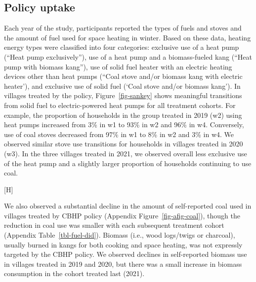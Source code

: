 \documentclass[
  letterpaper,
  DIV=11,
  numbers=noendperiod]{scrartcl}
\makeatletter
\renewenvironment{figure}%
   {\renewcommand\familydefault\sfdefault
    \@float{figure}}
   {\end@float}
\makeatother
\begin{document}
\subsection{Policy uptake}\label{policy-uptake}

Each year of the study, participants reported the types of fuels and
stoves and the amount of fuel used for space heating in winter. Based on
these data, heating energy types were classified into four categories:
exclusive use of a heat pump (``Heat pump exclusively''), use of a heat
pump and a biomass-fueled kang (``Heat pump with biomass kang''), use of
solid fuel heater with an electric heating devices other than heat pumps
(``Coal stove and/or biomass kang with electric heater'), and exclusive
use of solid fuel (`Coal stove and/or biomass kang'). In villages
treated by the policy, Figure~\ref{fig-sankey} shows meaningful
transitions from solid fuel to electric-powered heat pumps for all
treatment cohorts. For example, the proportion of households in the
group treated in 2019 (w2) using heat pumps increased from 3\% in w1 to
93\% in w2 and 96\% in w4. Conversely, use of coal stoves decreased from
97\% in w1 to 8\% in w2 and 3\% in w4. We observed similar stove use
transitions for households in villages treated in 2020 (w3). In the
three villages treated in 2021, we observed overall less exclusive use
of the heat pump and a slightly larger proportion of households
continuing to use coal.

\begin{figure}[H]


\caption{\label{fig-sankey}Transitions to different energy sources
across study waves}

\end{figure}%

We also observed a substantial decline in the amount of self-reported
coal used in villages treated by CBHP policy (Appendix
Figure~\ref{fig-afig-coal}), though the reduction in coal use was
smaller with each subsequent treatment cohort (Appendix
Table~\ref{tbl-fuel-did}). Biomass (i.e., wood logs/twigs or charcoal),
usually burned in kangs for both cooking and space heating, was not
expressly targeted by the CBHP policy. We observed declines in
self-reported biomass use in villages treated in 2019 and 2020, but
there was a small increase in biomass consumption in the cohort treated
last (2021).
\end{document}
